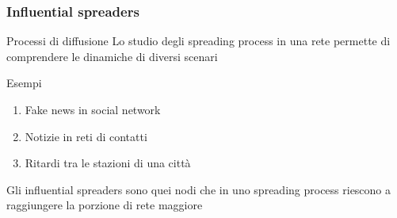 \begin{frame}
    \frametitle{Influential spreaders}

    \begin{block}{Processi di diffusione}
        Lo studio degli \alert{spreading process} in una rete permette di comprendere le dinamiche di diversi scenari       
    \end{block}
    \begin{exampleblock}{Esempi}
        \begin{enumerate}
            \item Fake news in social network
            \item Notizie in reti di contatti
            \item Ritardi tra le stazioni di una città
        \end{enumerate}
    \end{exampleblock}
    \begin{definizione}
        Gli \alert{influential spreaders} sono quei nodi che in uno spreading process 
        riescono a raggiungere la porzione di rete maggiore        
    \end{definizione}
\end{frame}